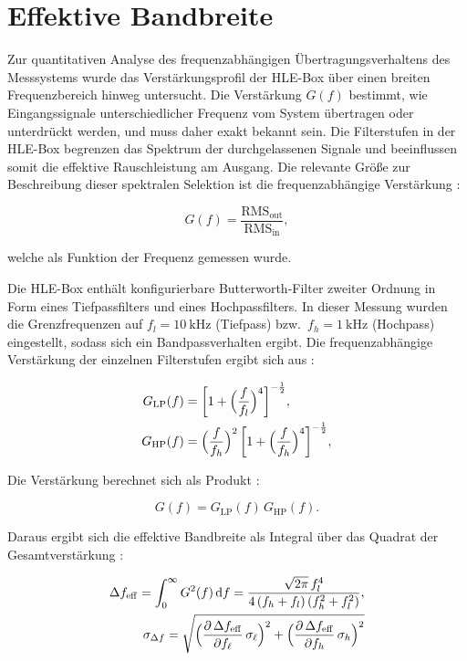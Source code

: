 \chapter{Effektive Bandbreite} \label{effektive Bandbreite}

Zur quantitativen Analyse des frequenzabhängigen Übertragungsverhaltens des Messsystems wurde das Verstärkungsprofil der HLE-Box über einen breiten Frequenzbereich hinweg untersucht. 
Die Verstärkung $G(f)$ bestimmt, wie Eingangssignale unterschiedlicher Frequenz vom System übertragen oder unterdrückt werden, und muss daher exakt bekannt sein. 
Die Filterstufen in der HLE-Box begrenzen das Spektrum der durchgelassenen Signale und beeinflussen somit die effektive Rauschleistung am Ausgang. 
Die relevante Größe zur Beschreibung dieser spektralen Selektion ist die frequenzabhängige Verstärkung \cite{praktikum}: 

\begin{equation}
  G(f) = \frac{\mathrm{RMS}_{\mathrm{out}}}{\mathrm{RMS}_{\mathrm{in}}},
\end{equation}

welche als Funktion der Frequenz gemessen wurde.

Die HLE-Box enthält konfigurierbare Butterworth-Filter zweiter Ordnung in Form eines Tiefpassfilters und eines Hochpassfilters. 
In dieser Messung wurden die Grenzfrequenzen auf $f_l = \SI{10}{\kilo\hertz}$ (Tiefpass) bzw.\ $f_h = \SI{1}{\kilo\hertz}$ (Hochpass) eingestellt, sodass sich ein Bandpassverhalten ergibt. 
Die frequenzabhängige Verstärkung der einzelnen Filterstufen ergibt sich aus \cite{praktikum}:

\begin{align}
  G_{\mathrm{LP}}(f) &= \biggl[1 + \Bigl(\frac{f}{f_l}\Bigr)^4\biggr]^{-\frac{1}{2}}, \\
  G_{\mathrm{HP}}(f) &= \Bigl(\frac{f}{f_h}\Bigr)^2 \,\biggl[1 + \Bigl(\frac{f}{f_h}\Bigr)^4\biggr]^{-\frac{1}{2}},
\end{align}

Die Verstärkung berechnet sich als Produkt \cite{praktikum}:

\begin{equation}
  G(f) = G_{\mathrm{LP}}(f)\,G_{\mathrm{HP}}(f).
\end{equation}

Daraus ergibt sich die effektive Bandbreite als Integral über das Quadrat der Gesamtverstärkung \cite{praktikum}:

\begin{equation}
\begin{aligned}
\Delta f_{\mathrm{eff}}
= \int_{0}^{\infty} G^2(f)\,\mathrm{d}f
= \frac{\sqrt{2\pi}\,f_l^4}{4\,(f_h + f_l)\,(f_h^2 + f_l^2)},\\
\sigma_{\Delta f}
= \sqrt{
  \Bigl(\frac{\partial\,\Delta f_{\mathrm{eff}}}{\partial f_\ell}\,\sigma_\ell\Bigr)^{2}
  +\Bigl(\frac{\partial\,\Delta f_{\mathrm{eff}}}{\partial f_h}\,\sigma_h\Bigr)^{2}
}
\end{aligned}
\end{equation}

